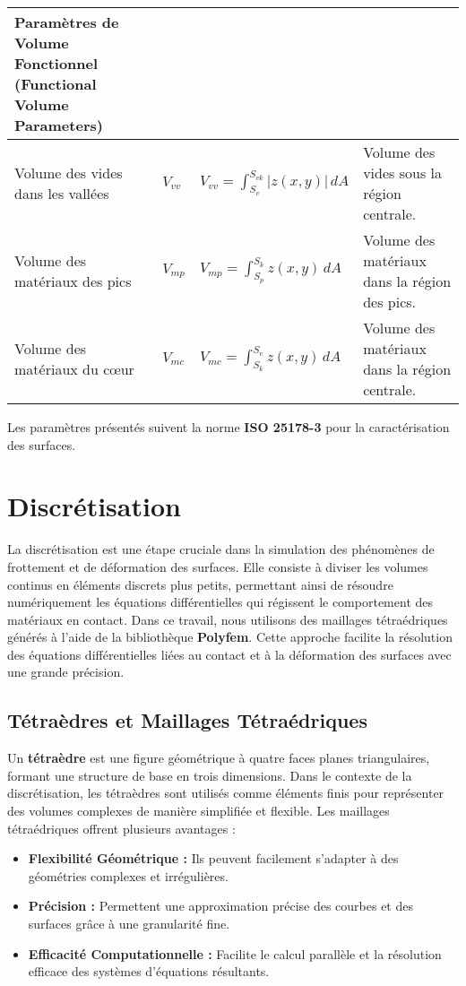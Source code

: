 \begin{longtable}{|p{3.5cm}|p{1.5cm}|p{6cm}|p{6cm}|}
    \textbf{Paramètres de Volume Fonctionnel (Functional Volume Parameters)} & & & \\ \hline
    Volume des vides dans les vallées & $V_{vv}$ & $V_{vv} = \int_{S_v}^{S_{vk}} |z(x, y)| \, dA$ & Volume des vides sous la région centrale. \\ \hline
    Volume des matériaux des pics & $V_{mp}$ & $V_{mp} = \int_{S_p}^{S_k} z(x, y) \, dA$ & Volume des matériaux dans la région des pics. \\ \hline
    Volume des matériaux du cœur & $V_{mc}$ & $V_{mc} = \int_{S_k}^{S_v} z(x, y) \, dA$ & Volume des matériaux dans la région centrale. \\ \hline
\end{longtable}

\noindent Les paramètres présentés suivent la norme \textbf{ISO 25178-3} pour la caractérisation des surfaces.




\section{Discrétisation}

La discrétisation est une étape cruciale dans la simulation des phénomènes de frottement et de déformation des surfaces. Elle consiste à diviser les volumes continus en éléments discrets plus petits, permettant ainsi de résoudre numériquement les équations différentielles qui régissent le comportement des matériaux en contact. Dans ce travail, nous utilisons des maillages tétraédriques générés à l'aide de la bibliothèque \textbf{Polyfem}. Cette approche facilite la résolution des équations différentielles liées au contact et à la déformation des surfaces avec une grande précision.

\subsection{Tétraèdres et Maillages Tétraédriques}

Un \textbf{tétraèdre} est une figure géométrique à quatre faces planes triangulaires, formant une structure de base en trois dimensions. Dans le contexte de la discrétisation, les tétraèdres sont utilisés comme éléments finis pour représenter des volumes complexes de manière simplifiée et flexible. Les maillages tétraédriques offrent plusieurs avantages :
\begin{itemize}
    \item \textbf{Flexibilité Géométrique :} Ils peuvent facilement s'adapter à des géométries complexes et irrégulières.
    \item \textbf{Précision :} Permettent une approximation précise des courbes et des surfaces grâce à une granularité fine.
    \item \textbf{Efficacité Computationnelle :} Facilite le calcul parallèle et la résolution efficace des systèmes d'équations résultants.
\end{itemize}

